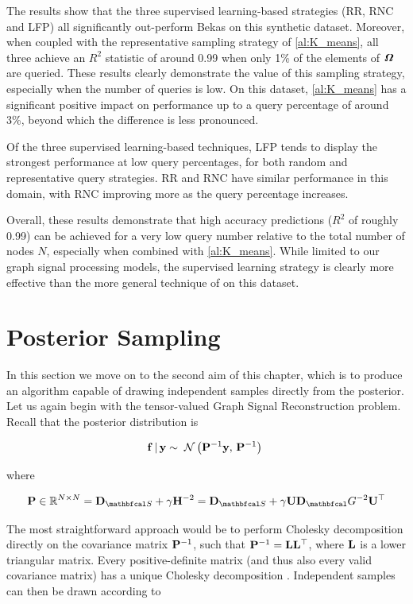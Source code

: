 The results show that the three supervised learning-based strategies (RR, RNC and LFP) all significantly out-perform Bekas on this synthetic dataset. Moreover, when coupled with the representative sampling strategy of \cref{al:K_means}, all three achieve an $R^2$ statistic of around 0.99 when only 1\% of the elements of $\bm{\mathit{\Omega}}$ are queried. These results clearly demonstrate the value of this sampling strategy, especially when the number of queries is low. On this dataset, \cref{al:K_means} has a significant positive impact on performance up to a query percentage of around 3\%, beyond which the difference is less pronounced. 

Of the three supervised learning-based techniques, LFP tends to display the strongest performance at low query percentages, for both random and representative query strategies. RR and RNC have similar performance in this domain, with RNC improving more as the query percentage increases. 

Overall, these results demonstrate that high accuracy predictions ($R^2$ of roughly 0.99) can be achieved for a very low query number relative to the total number of nodes $N$, especially when combined with \cref{al:K_means}. While limited to our graph signal processing models, the supervised learning strategy is clearly more effective than the more general technique of \cite{Bekas2007} on this dataset. 


\section{Posterior Sampling}

\label{sec:sampling}


In this section we move on to the second aim of this chapter, which is to produce an algorithm capable of drawing independent samples directly from the posterior. Let us again begin with the tensor-valued Graph Signal Reconstruction problem. Recall that the posterior distribution is 

\begin{equation}
    \mathbf{f} \, | \, \mathbf{y} \sim \; \mathcal{N}\left(\mathbf{P}^{-1} \mathbf{y}, \, \mathbf{P}^{-1}\right) \;
\end{equation}

where 

\begin{equation}
    \PP \in \R^{N \times N} = \D_{\St} + \gamma \HH^{-2} = \D_{\St} + \gamma \U \D_\Gt^{-2} \U^\top 
\end{equation}

The most straightforward approach would be to perform Cholesky decomposition directly on the covariance matrix $\mathbf{P}^{-1}$, such that $\mathbf{P}^{-1} = \mathbf{L} \mathbf{L}^\top$, where $\mathbf{L}$ is a lower triangular matrix. Every positive-definite matrix (and thus also every valid covariance matrix) has a unique Cholesky decomposition \citep{Horn2012}. Independent samples can then be drawn according to 

